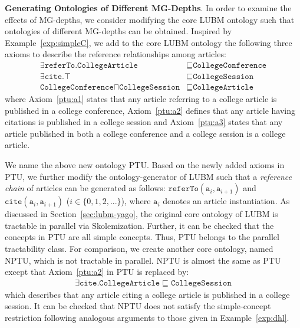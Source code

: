 \textbf{Generating Ontologies of Different MG-Depths}.
In order to examine the effects of MG-depths, we consider modifying the core LUBM ontology
such that ontologies of different MG-depths can be obtained.
Inspired by Example~\ref{exp:simpleC},
we add to the core LUBM ontology the following three axioms to
describe the reference relationships among articles:
\begin{align}
\exists\texttt{referTo}.\texttt{CollegeArticle} & \sqsubseteq\texttt{CollegeConference}\label{ptu:a1}\tag{$\beta_1$}\\
\exists\texttt{cite}.\top & \sqsubseteq\texttt{CollegeSession}\label{ptu:a2}\tag{$\beta_2$}\\
\texttt{CollegeConference}\sqcap\texttt{CollegeSession} & \sqsubseteq\texttt{CollegeArticle}\label{ptu:a3}\tag{$\beta_3$}
\end{align}
where Axiom~\eqref{ptu:a1} states that any article referring to a
college article is published in a college conference,
Axiom~\eqref{ptu:a2} defines that any article having citations is
published in a college session and Axiom~\eqref{ptu:a3} states that
any article published in both a college conference and a college
session is a college article.

We name the above new ontology PTU.
Based on the newly added axioms in PTU, we further modify the ontology-generator
of LUBM such that a \emph{reference chain} of articles can be generated as follows:
$\texttt{referTo}(\texttt{a}_i,\texttt{a}_{i+1})$ and
$\texttt{cite}(\texttt{a}_i,\texttt{a}_{i+1})$ ($i\in\{0,1,2,...\}$),
where $\texttt{a}_i$ denotes an article instantiation.
As discussed in Section~\ref{sec:lubm-yago},
the original core ontology of LUBM is tractable in parallel via
Skolemization. Further, it can be checked that the concepts in PTU
are all simple concepts. Thus, PTU belongs to the parallel tractability class.
For comparison, we create another core ontology, named NPTU, which
is not tractable in parallel. NPTU is almost the same as PTU except that
Axiom~\eqref{ptu:a2} in PTU is replaced by:
\begin{align}
\exists\texttt{cite}.\texttt{CollegeArticle}\sqsubseteq\texttt{CollegeSession}\label{nptu:a1}\tag{$\beta_4$}
\end{align}
which describes that any article citing a college article is published in a
college session.
It can be checked that NPTU does not satisfy the simple-concept
restriction following analogous arguments to those given in Example~\ref{exp:dhl}.

